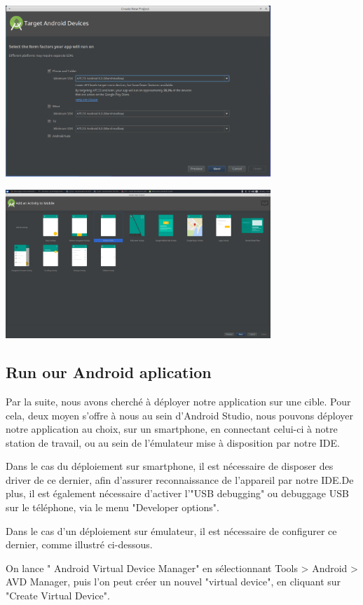 \documentclass[french,a4paper,12pt]{report}
\begin{document}
\includegraphics[width=10cm]{3Sdk.png}

\includegraphics[width=10cm]{4Activity.png}

\subsection{Run our Android aplication}
Par la suite, nous avons cherché à déployer notre application sur une cible.
Pour cela, deux moyen s'offre à nous au sein d'Android Studio, nous pouvons
déployer notre application au choix, sur un smartphone, en connectant celui-ci
à notre station de travail, ou au sein de l'émulateur mise à disposition par
notre IDE.

Dans le cas du déploiement sur smartphone, il est nécessaire de disposer des
driver de ce dernier, afin d'assurer reconnaissance de l'appareil par notre
IDE.De plus, il est également nécessaire d'activer l'"USB debugging" ou debuggage USB
sur le téléphone, via le menu "Developer options".

Dans le cas d'un déploiement sur émulateur, il est nécessaire de configurer ce
dernier, comme illustré ci-dessous.

On lance " Android Virtual Device Manager" en sélectionnant Tools > Android > AVD Manager,
puis l'on peut créer un nouvel "virtual device", en cliquant sur "Create Virtual Device".
\end{document}
